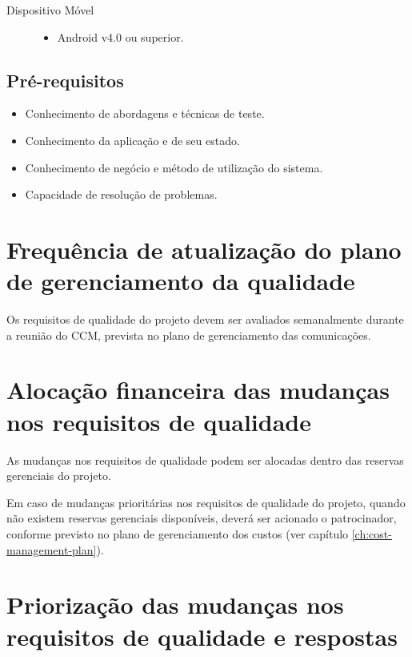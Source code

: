 \begin{description}
	\item[Dispositivo Móvel] \hfill
	\begin{itemize}
		\item Android v4.0 ou superior.
	\end{itemize}
\end{description}

\subsection{Pré-requisitos}

\begin{itemize}
	\item Conhecimento de abordagens e técnicas de teste.
	\item Conhecimento da aplicação e de seu estado.
	\item Conhecimento de negócio e método de utilização do sistema.
	\item Capacidade de resolução de problemas.
\end{itemize}

\section{Frequência de atualização do plano de gerenciamento da qualidade}

Os requisitos de qualidade do projeto devem ser avaliados semanalmente durante a reunião do CCM, prevista no plano de gerenciamento das comunicações.

\section{Alocação financeira das mudanças nos requisitos de qualidade}

As mudanças nos requisitos de qualidade podem ser alocadas dentro das reservas gerenciais do projeto.

Em caso de mudanças prioritárias nos requisitos de qualidade do projeto, quando não existem reservas gerenciais disponíveis, deverá ser acionado o patrocinador, conforme previsto no plano de gerenciamento dos custos (ver capítulo \ref{ch:cost-management-plan}).

\section{Priorização das mudanças nos requisitos de qualidade e respostas}

